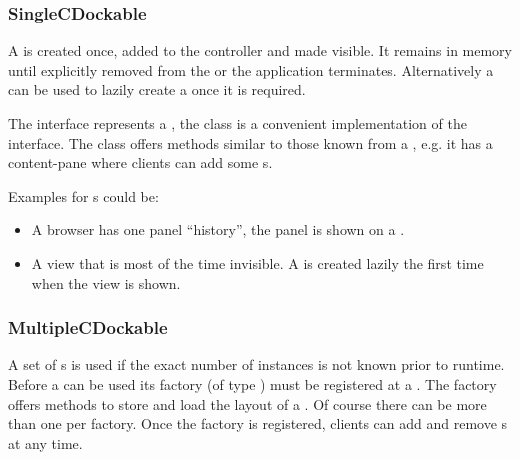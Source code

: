 
\subsubsection{SingleCDockable}
A  is created once, added to the controller and made visible. It remains in memory until explicitly removed from the  or the application terminates. Alternatively a  can be used to lazily create a  once it is required.

The interface  represents a , the class  is a convenient implementation of the interface. The class offers methods similar to those known from a , e.g. it has a content-pane where clients can add some s.

Examples for s could be:
\begin{itemize}
  \item A browser has one panel ``history'', the panel is shown on a \linebreak {}.
  \item A view that is most of the time invisible. A  is created lazily the first time when the view is shown.
\end{itemize}

\subsubsection{MultipleCDockable}
A set of s is used if the exact number of instances is not known prior to runtime. Before a  can be used its factory (of type ) must be registered at a . The factory offers methods to store and load the layout of a . Of course there can be more than one  per factory. Once the factory is registered, clients can add and remove \linebreak {}s at any time.


